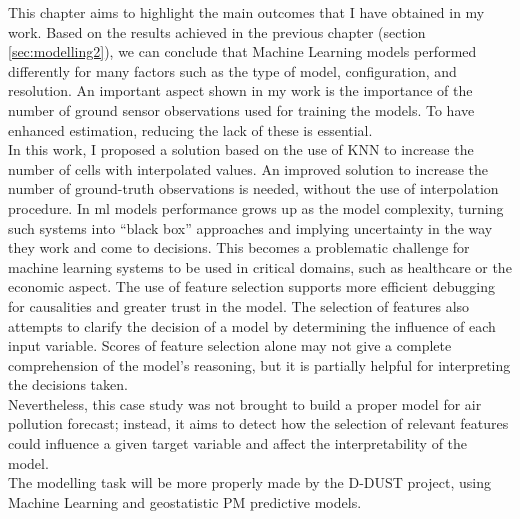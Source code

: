 This chapter aims to highlight the main outcomes that I have obtained in my work.
Based on the results achieved in the previous chapter (section \ref{sec:modelling2}), we can conclude that Machine Learning models performed differently for many factors such as the type of model, configuration, and resolution.
An important aspect shown in my work is the importance of the number of ground sensor observations used for training the models. To have enhanced estimation, reducing the lack of these is essential.\\
In this work, I proposed a solution based on the use of KNN to increase the number of cells with interpolated values. An improved solution to increase the number of ground-truth observations is needed, without the use of interpolation procedure.
In \acrshort{ml} models performance grows up as the model complexity, turning such systems into “black box” approaches and implying uncertainty in the way they work and come to decisions. 
This becomes a problematic challenge for machine learning systems to be used in critical domains, such as healthcare or the economic aspect.
The use of feature selection supports more efficient debugging for causalities and greater trust in the model.
The selection of features also attempts to clarify the decision of a model by determining the influence of each input variable. 
Scores of feature selection alone may not give a complete comprehension of the model’s reasoning, but it is partially helpful for interpreting the decisions taken.\\
Nevertheless, this case study was not brought to build a proper model for air pollution forecast; instead, it aims to detect how the selection of relevant features could influence a given target variable and affect the interpretability of the model. \\
The modelling task will be more properly made by the D-DUST project, using Machine Learning and geostatistic PM predictive models.\\


